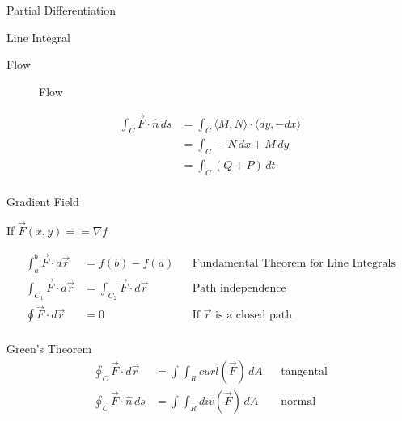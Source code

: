 \begin{section}{Partial Differentiation}
\begin{section}{Line Integral}
\begin{subsection}{Flow}
\begin{figure}[h!]
\begin{center}
          \caption{Flow}
        \end{center}
      \end{figure}
      \begin{align*}
        \int_C \vec{F}\cdot\hat{n}\,ds
                                      &= \int_C \langle M,N \rangle \cdot \langle dy,-dx \rangle \\
                                      &= \int_C -N\,dx + M\,dy \\
                                      &= \int_C (Q + P) \,dt \\
      \end{align*}
      \FloatBarrier
    \end{subsection} %
  \end{section}

  \begin{section}{Gradient Field}

    If $\vec{F}(x,y) == \nabla{f}$

    \begin{align*}
      \int_a^b \vec{F} \cdot d\vec{r} &= f(b) - f(a) &&
      \text{Fundamental Theorem for Line Integrals}\\
      \int_{C_1} \vec{F} \cdot d\vec{r} &= \int_{C_2} \vec{F} \cdot d\vec{r} &&
      \text{Path independence}\\
      \oint \vec{F} \cdot d\vec{r} &= 0 &&
      \text{If $\vec{r}$ is a closed path}\\
    \end{align*}
  \end{section}

  \begin{section}{Green's Theorem}
    \begin{align*}
      \oint_C \vec{F} \cdot d\vec{r} &= \int\int_R curl(\vec{F})\,dA && \text{tangental} \\
      \oint_C \vec{F} \cdot \hat{n}\, ds &= \int\int_R div(\vec{F})\,dA && \text{normal} \\
    \end{align*}
  \end{section}


\end{section}
